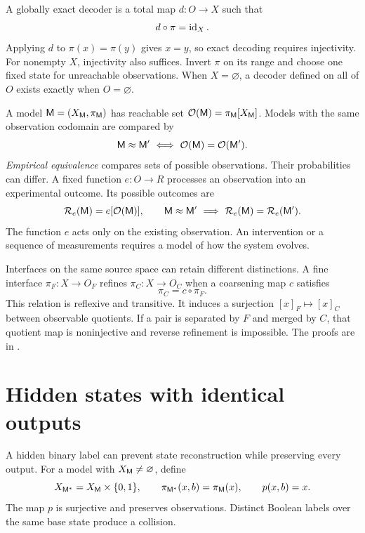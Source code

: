 A globally exact decoder is a total map \(d:O\to X\) such that
\begin{equation}
d\circ\pi=\operatorname{id}_X.
\label{eq:decoder}
\end{equation}
Applying \(d\) to \(\pi(x)=\pi(y)\) gives \(x=y\), so exact decoding requires injectivity. For nonempty \(X\), injectivity also suffices. Invert \(\pi\) on its range and choose one fixed state for unreachable observations. When \(X=\varnothing\), a decoder defined on all of \(O\) exists exactly when \(O=\varnothing\).

A model \(\mathsf M=(X_\mathsf M,\pi_\mathsf M)\) has reachable set \(\mathcal O(\mathsf M)=\pi_\mathsf M[X_\mathsf M]\). Models with the same observation codomain are compared by
\begin{equation}
\mathsf M\approx\mathsf M'\ \Longleftrightarrow\
\mathcal O(\mathsf M)=\mathcal O(\mathsf M').
\label{eq:modelequivalence}
\end{equation}
\emph{Empirical equivalence} compares sets of possible observations. Their probabilities can differ. A fixed function \(e:O\to R\) processes an observation into an experimental outcome. Its possible outcomes are
\begin{equation}
\mathcal R_e(\mathsf M)=e[\mathcal O(\mathsf M)],\qquad
\mathsf M\approx\mathsf M'\ \Longrightarrow\
\mathcal R_e(\mathsf M)=\mathcal R_e(\mathsf M').
\label{eq:outcomes}
\end{equation}
The function \(e\) acts only on the existing observation. An intervention or a sequence of measurements requires a model of how the system evolves.

Interfaces on the same source space can retain different distinctions. A fine interface \(\pi_F:X\to O_F\) refines \(\pi_C:X\to O_C\) when a coarsening map \(c\) satisfies
\begin{equation}
\pi_C=c\circ\pi_F.
\label{eq:refinement}
\end{equation}
This relation is reflexive and transitive. It induces a surjection \([x]_F\mapsto[x]_C\) between observable quotients. If a pair is separated by \(F\) and merged by \(C\), that quotient map is noninjective and reverse refinement is impossible. The proofs are in .

\section{Hidden states with identical outputs}
\label{sec:mainresult}
A hidden binary label can prevent state reconstruction while preserving every output. For a model with \(X_\mathsf M\neq\varnothing\), define
\begin{equation}
X_{\mathsf M^{\ast}}=X_\mathsf M\times\{0,1\},\qquad
\pi_{\mathsf M^{\ast}}(x,b)=\pi_\mathsf M(x),\qquad p(x,b)=x.
\label{eq:extension}
\end{equation}
The map \(p\) is surjective and preserves observations. Distinct Boolean labels over the same base state produce a collision.


